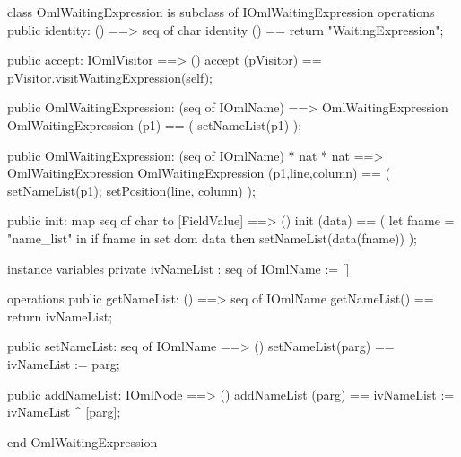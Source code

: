 \begin{vdm_al}
class OmlWaitingExpression is subclass of IOmlWaitingExpression
operations
  public identity: () ==> seq of char
  identity () == return "WaitingExpression";

  public accept: IOmlVisitor ==> ()
  accept (pVisitor) == pVisitor.visitWaitingExpression(self);

  public OmlWaitingExpression:
    (seq of IOmlName) ==> OmlWaitingExpression
  OmlWaitingExpression (p1) == 
    ( setNameList(p1) );

  public OmlWaitingExpression:
    (seq of IOmlName) *
    nat *
    nat ==> OmlWaitingExpression
  OmlWaitingExpression (p1,line,column) == 
    ( setNameList(p1);
      setPosition(line, column) );

  public init: map seq of char to [FieldValue] ==> ()
  init (data) ==
    ( let fname = "name_list" in
        if fname in set dom data
        then setNameList(data(fname)) );

instance variables
  private ivNameList : seq of IOmlName := []

operations
  public getNameList: () ==> seq of IOmlName
  getNameList() == return ivNameList;

  public setNameList: seq of IOmlName ==> ()
  setNameList(parg) == ivNameList := parg;

  public addNameList: IOmlNode ==> ()
  addNameList (parg) == ivNameList := ivNameList ^ [parg];

end OmlWaitingExpression
\end{vdm_al}

